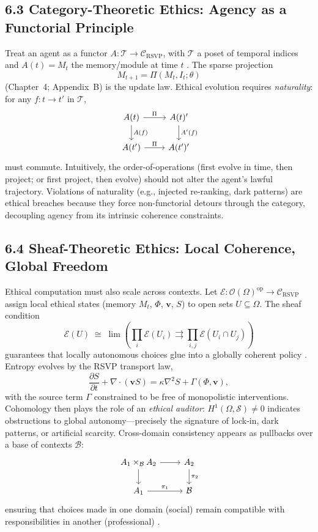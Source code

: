 \documentclass[12pt]{article}
\begin{document}
\subsection*{6.3 Category-Theoretic Ethics: Agency as a Functorial Principle}

Treat an agent as a functor \(A:\mathcal{T}\to\mathcal{C}_{\text{RSVP}}\), with \(\mathcal{T}\) a poset
of temporal indices and \(A(t)=M_t\) the memory/module at time \(t\)
\citep{lawvere2009, maclane1998}. The sparse projection
\[
M_{t+1}=\Pi(M_t, I_t;\theta)
\]
(Chapter~4; Appendix~B) is the update law. Ethical evolution requires \emph{naturality}:
for any \(f:t\to t'\) in \(\mathcal{T}\),
\[
\begin{tikzcd}
A(t) \arrow[r, "\Pi"] \arrow[d, "A(f)"] & A(t)'\arrow[d, "A'(f)"] \\
A(t') \arrow[r, "\Pi"] & A(t')'
\end{tikzcd}
\]
must commute. Intuitively, the order-of-operations (first evolve in time, then project;
or first project, then evolve) should not alter the agent’s lawful trajectory. Violations
of naturality (e.g., injected re-ranking, dark patterns) are ethical breaches because they
force non-functorial detours through the category, decoupling agency from its intrinsic
coherence constraints.

\subsection*{6.4 Sheaf-Theoretic Ethics: Local Coherence, Global Freedom}

Ethical computation must also scale across contexts. Let
\(\mathcal{E}:\mathcal{O}(\Omega)^{\mathrm{op}}\!\to\!\mathcal{C}_{\text{RSVP}}\) assign local ethical states (memory
\(M_t\), \(\Phi\), \(\mathbf{v}\), \(S\)) to open sets \(U\subseteq\Omega\). The sheaf condition
\[
\mathcal{E}(U) \;\cong\; \lim\!\left( \prod_i \mathcal{E}(U_i)
\rightrightarrows \prod_{i,j}\mathcal{E}(U_i\!\cap\!U_j) \right)
\]
guarantees that locally autonomous choices glue into a globally coherent policy
\citep{maclane1998, hatcher2002}. Entropy evolves by the RSVP transport law,
\[
\frac{\partial S}{\partial t} + \nabla\!\cdot(\mathbf{v}S)
= \kappa \nabla^2 S + \Gamma(\Phi,\mathbf{v}),
\]
with the source term \(\Gamma\) constrained to be free of monopolistic interventions. Cohomology
then plays the role of an \emph{ethical auditor}: \(H^1(\Omega,\mathcal{S})\neq 0\) indicates
obstructions to global autonomy—precisely the signature of lock-in, dark patterns, or
artificial scarcity. Cross-domain consistency appears as pullbacks over a base of contexts
\(\mathcal{B}\):
\[
\begin{tikzcd}
A_1 \times_{\mathcal{B}} A_2 \arrow[r] \arrow[d] & A_2 \arrow[d, "\pi_2"] \\
A_1 \arrow[r, "\pi_1"] & \mathcal{B}
\end{tikzcd}
\]
ensuring that choices made in one domain (social) remain compatible with responsibilities
in another (professional) \citep{deleuze1987}.
\end{document}

